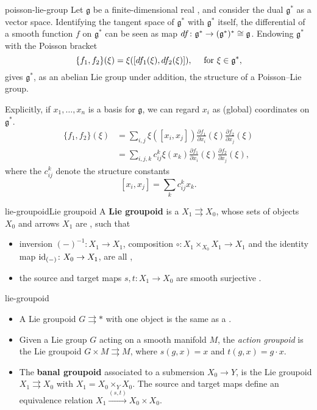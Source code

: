 \begin{example}{poisson-lie-group}
    Let $\mathfrak{g}$ be a finite-dimensional real , and consider the dual $\mathfrak{g}^*$ as a vector space. Identifying the tangent space of $\mathfrak{g}^*$ with $\mathfrak{g}^*$ itself, the differential of a smooth function $f$ on $\mathfrak{g}^*$ can be seen as map $df \colon \mathfrak{g}^* \to (\mathfrak{g}^*)^* \cong \mathfrak{g}$. Endowing $\mathfrak{g}^*$ with the Poisson bracket
    \[ \{ f_1, f_2 \}(\xi) = \xi([df_1(\xi), df_2(\xi)]), \quad \textup{ for } \xi \in \mathfrak{g}^* , \]
    gives $\mathfrak{g}^*$, as an abelian Lie group under addition, the structure of a Poisson--Lie group.
    
    Explicitly, if $x_1, \ldots, x_n$ is a basis for $\mathfrak{g}$, we can regard $x_i$ as (global) coordinates on $\mathfrak{g}^*$.
    \[ \begin{aligned}
        \{ f_1, f_2 \}(\xi)
            &= \sum_{i, j} \xi([ x_i, x_j]) \frac{\partial f_1}{\partial x_i}(\xi) \frac{\partial f_2}{\partial x_j} (\xi) \\
            &= \sum_{i, j, k} c_{ij}^k \xi(x_k) \frac{\partial f_1}{\partial x_i}(\xi) \frac{\partial f_2}{\partial x_j} (\xi) ,
    \end{aligned} \]
    where the $c_{ij}^k$ denote the structure constants
    \[ [x_i, x_j] = \sum_k c_{ij}^k x_k . \]
\end{example}

\begin{topic}{lie-groupoid}{Lie groupoid}
    A \textbf{Lie groupoid} is a  $X_1 \rightrightarrows X_0$, whose sets of objects $X_0$ and arrows $X_1$ are , such that
    \begin{itemize}
        \item inversion $(-)^{-1} \colon X_1 \to X_1$, composition $\circ \colon X_1 \times_{X_0} X_1 \to X_1$ and the identity map $\textup{id}_{(-)} \colon X_0 \to X_1$, are all ,
        \item the source and target maps $s, t \colon X_1 \to X_0$ are smooth surjective .
    \end{itemize}
\end{topic}

\begin{example}{lie-groupoid}
    \begin{itemize}
        \item A Lie groupoid $G \rightrightarrows *$ with one object is the same as a .
        \item Given a Lie group $G$ acting on a smooth manifold $M$, the \textit{action groupoid} is the Lie groupoid $G \times M \rightrightarrows M$, where $s(g, x) = x$ and $t(g, x) = g \cdot x$.
        \item The \textbf{banal groupoid} associated to a submersion $X_0 \to Y$, is the Lie groupoid $X_1 \rightrightarrows X_0$ with $X_1 = X_0 \times_Y X_0$. The source and target maps define an equivalence relation $X_1 \xrightarrow{(s, t)} X_0 \times X_0$.
    \end{itemize}
\end{example}

